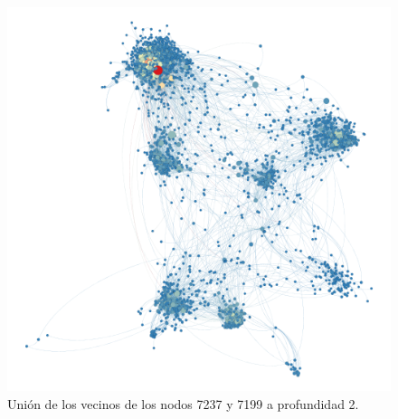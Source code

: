 \begin{figure}[H]
    \centerfloat
    \includegraphics[width=1.3\textwidth]{img/resultados/grado-vector7199y7237.png}
    \caption{Unión de los vecinos de los nodos 7237 y 7199 a profundidad 2.}
\end{figure}